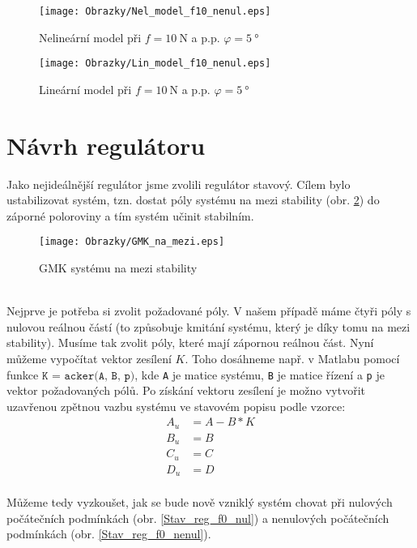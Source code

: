\documentclass[a4paper, 12pt]{article}
\begin{document}
			\begin{figure}[h]
				\begin{center}
					\texttt{[image: Obrazky/Nel\_model\_f10\_nenul.eps]}
					\label{Nel_model_f10_nenul}
					\caption{Nelineární model při $f=\SI{10}{\newton}$ a p.p. $\varphi = \SI{5}{\degree}$}
				\end{center}
				\begin{center}
					\texttt{[image: Obrazky/Lin\_model\_f10\_nenul.eps]}
					\label{Lin_model_f10_nenul}
					\caption{Lineární model při $f=\SI{10}{\newton}$ a p.p. $\varphi = \SI{5}{\degree}$}
				\end{center}
			\end{figure}
	\clearpage
	\section{Návrh regulátoru}
		Jako nejideálnější regulátor jsme zvolili regulátor stavový. Cílem bylo ustabilizovat systém, tzn. dostat póly systému na mezi stability (obr. \ref{GMK_na_mezi}) do záporné poloroviny a tím systém učinit stabilním.	
		\begin{figure}[h]
			\begin{center}
				\texttt{[image: Obrazky/GMK\_na\_mezi.eps]}
				\label{GMK_na_mezi}
				\caption{GMK systému na mezi stability}
			\end{center}
		\end{figure}
		\\Nejprve je potřeba si zvolit požadované póly. V našem případě máme čtyři póly s nulovou reálnou částí (to způsobuje kmitání systému, který je díky tomu na mezi stability). Musíme tak zvolit póly, které mají zápornou reálnou část. Nyní můžeme vypočítat vektor zesílení $K$. Toho dosáhneme např. v Matlabu pomocí funkce $\texttt{K = acker(A, B, p)}$, kde \texttt{A} je matice systému, \texttt{B} je matice řízení a \texttt{p} je vektor požadovaných pólů. Po získání vektoru zesílení je možno vytvořit uzavřenou zpětnou vazbu systému ve stavovém popisu podle vzorce:
		\begin{align*}
			A_u &= A-B*K\\
			B_u &= B\\
			C_u &= C\\
			D_u &= D
		\end{align*}
		\\Můžeme tedy vyzkoušet, jak se bude nově vzniklý systém chovat při nulových počátečních podmínkách (obr. \ref{Stav_reg_f0_nul}) a nenulových počátečních podmínkách (obr. \ref{Stav_reg_f0_nenul}).
\end{document}
